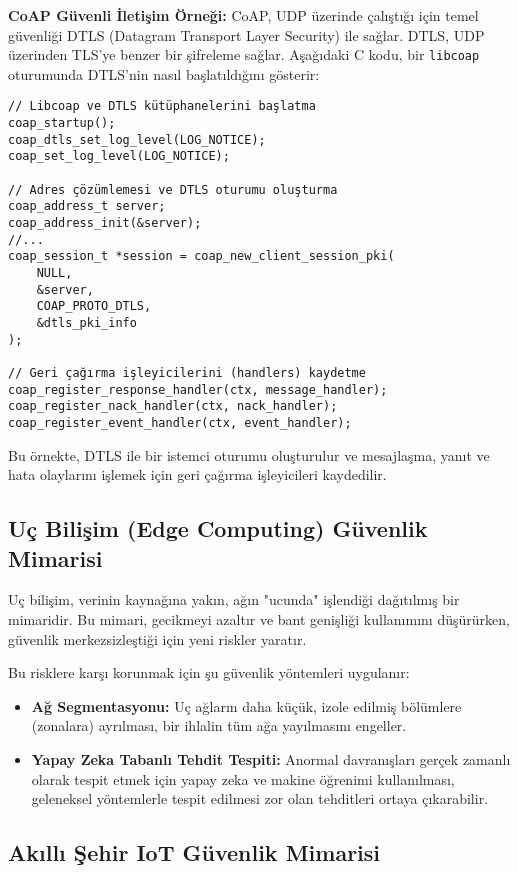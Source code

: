 \textbf{CoAP Güvenli İletişim Örneği:}
CoAP, UDP üzerinde çalıştığı için temel güvenliği DTLS (Datagram Transport Layer Security) ile sağlar. DTLS, UDP üzerinden TLS'ye benzer bir şifreleme sağlar. Aşağıdaki C kodu, bir \verb|libcoap| oturumunda DTLS'nin nasıl başlatıldığını gösterir:
\begin{lstlisting}[breaklines=true,basicstyle=\ttfamily\footnotesize]
// Libcoap ve DTLS kütüphanelerini başlatma
coap_startup();
coap_dtls_set_log_level(LOG_NOTICE);
coap_set_log_level(LOG_NOTICE);

// Adres çözümlemesi ve DTLS oturumu oluşturma
coap_address_t server;
coap_address_init(&server);
//...
coap_session_t *session = coap_new_client_session_pki(
    NULL,
    &server,
    COAP_PROTO_DTLS,
    &dtls_pki_info
);

// Geri çağırma işleyicilerini (handlers) kaydetme
coap_register_response_handler(ctx, message_handler);
coap_register_nack_handler(ctx, nack_handler);
coap_register_event_handler(ctx, event_handler);
\end{lstlisting}
Bu örnekte, DTLS ile bir istemci oturumu oluşturulur ve mesajlaşma, yanıt ve hata olaylarını işlemek için geri çağırma işleyicileri kaydedilir.

\subsection{Uç Bilişim (Edge Computing) Güvenlik Mimarisi}

Uç bilişim, verinin kaynağına yakın, ağın "ucunda" işlendiği dağıtılmış bir mimaridir. Bu mimari, gecikmeyi azaltır ve bant genişliği kullanımını düşürürken, güvenlik merkezsizleştiği için yeni riskler yaratır.

Bu risklere karşı korunmak için şu güvenlik yöntemleri uygulanır:
\begin{itemize}
    \item \textbf{Ağ Segmentasyonu:} Uç ağların daha küçük, izole edilmiş bölümlere (zonalara) ayrılması, bir ihlalin tüm ağa yayılmasını engeller.
    \item \textbf{Yapay Zeka Tabanlı Tehdit Tespiti:} Anormal davranışları gerçek zamanlı olarak tespit etmek için yapay zeka ve makine öğrenimi kullanılması, geleneksel yöntemlerle tespit edilmesi zor olan tehditleri ortaya çıkarabilir.
\end{itemize}

\subsection{Akıllı Şehir IoT Güvenlik Mimarisi}

